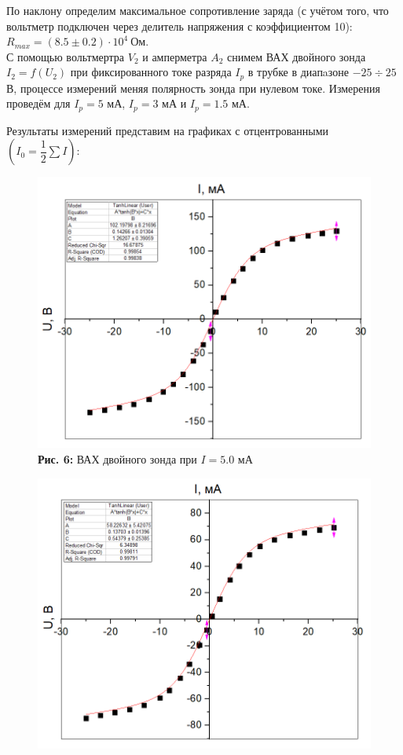 \documentclass[12pt,a4paper]{scrartcl}
\begin{document}
По наклону определим максимальное сопротивление заряда (с учётом того, что вольтметр подключен через делитель напряжения с коэффициентом 10): $R_{max} = (8.5\pm 0.2)\cdot 10^4~\text{Ом}$.\\
С помощью вольтмертра $V_2$ и амперметра $A_2$ снимем ВАХ двойного зонда $I_2 = f(U_2)$ при фиксированного токе разряда $I_p$ в трубке в диапaзоне $-25 \div 25$ В, процессе измерений меняя полярность зонда при нулевом токе. Измерения проведём для $I_p = 5$ мА, $I_p = 3$ мА  и $I_p = 1.5$ мА.

Результаты измерений представим на графиках с отцентрованными $\left(I_0 = \dfrac{1}{2}\sum I\right)$:

\begin{figure}[h]
\begin{minipage}{0.5\linewidth}
\begin{center}
\includegraphics[scale=0.5]{PIC_5.png}
\\\textbf{Рис. 6:} ВАХ двойного зонда при $I = 5.0$ мА
\end{center}
\end{minipage}
\begin{minipage}{0.5\linewidth}
\begin{center}
\includegraphics[scale=0.5]{PIC_7.png}

\end{center}
\end{minipage}
\end{figure}
\end{document}
